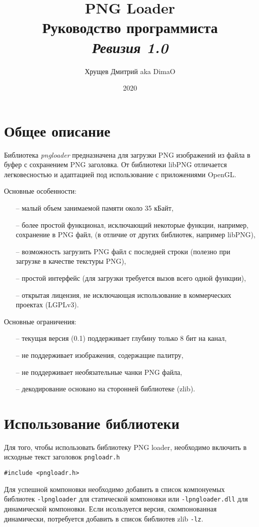 \documentclass[a4paper,12pt]{article}
\title{\Large{PNG Loader} \\ Руководство программиста \\ \textit{Ревизия 1.0}}
\date{2020}
\author{Хрущев Дмитрий aka DimaO}
\begin{document}
\maketitle
\newpage
\tableofcontents
\newpage
\section{Общее описание}
\label{section:common}
Библиотека \emph{pngloader} предназначена для загрузки PNG изображений из файла в буфер с сохранением PNG заголовка. От библиотеки libPNG отличается легковесностью и адаптацией под использование с приложениями OpenGL.

Основные особенности:
\begin{itemize}
\item[--] малый объем занимаемой памяти около 35 кБайт,
\item[--] более простой функционал, исключающий некоторые функции, например, сохранение в PNG файл‚ (в отличие от других библиотек, например libPNG),
\item[--] возможность загрузить PNG файл с последней строки (полезно при загрузке в качестве текстуры PNG),
\item[--] простой интерфейс (для загрузки требуется вызов всего одной функции),
\item[--] открытая лицензия, не исключающая использование в коммерческих проектах (LGPLv3).
\end{itemize}

Основные ограничения:
\begin{itemize}
\item[--] текущая версия (0.1) поддерживает глубину только 8 бит на канал,
\item[--] не поддерживает изображения, содержащие палитру,
\item[--] не поддерживает необязательные чанки PNG файла,
\item[--] декодирование основано на сторонней библиотеке (zlib).
\end{itemize}

\section{Использование библиотеки}
Для того, чтобы использовать библиотеку PNG loader, необходимо включить в исходные текст заголовок \texttt{pngloadr.h}

\leftskip=1.5cm
\texttt{\#include <pngloadr.h>}

\leftskip=0cm
Для успешной компоновки необходимо добавить в список компонуемых библиотек \texttt{-lpngloader} для статической компоновки или \texttt{-lpngloader.dll} для динамической компоновки. Если исользуется версия, скомпонованная динамически, потребуется добавить в список библиотев zlib \texttt{-lz}.
\end{document}
